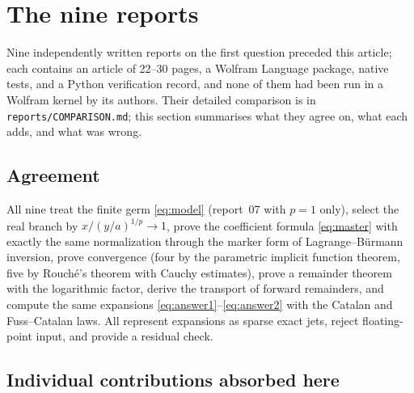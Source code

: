 \section{The nine reports}
\label{sec:reports}

Nine independently written reports on the first question \cite{reports} preceded this article; each contains an article of 22--30 pages, a Wolfram Language package, native tests, and a Python verification record, and none of them had been run in a Wolfram kernel by its authors. Their detailed comparison is in \texttt{reports/COMPARISON.md}; this section summarises what they agree on, what each adds, and what was wrong.

\subsection{Agreement}

All nine treat the finite germ \eqref{eq:model} (report~07 with $p=1$ only), select the real branch by $x/(y/a)^{1/p}\to1$, prove the coefficient formula \eqref{eq:master} with exactly the same normalization through the marker form of Lagrange--B\"urmann inversion, prove convergence (four by the parametric implicit function theorem, five by Rouch\'e's theorem with Cauchy estimates), prove a remainder theorem with the logarithmic factor, derive the transport of forward remainders, and compute the same expansions \eqref{eq:answer1}--\eqref{eq:answer2} with the Catalan and Fuss--Catalan laws. All represent expansions as sparse exact jets, reject floating-point input, and provide a residual check.

\subsection{Individual contributions absorbed here}

